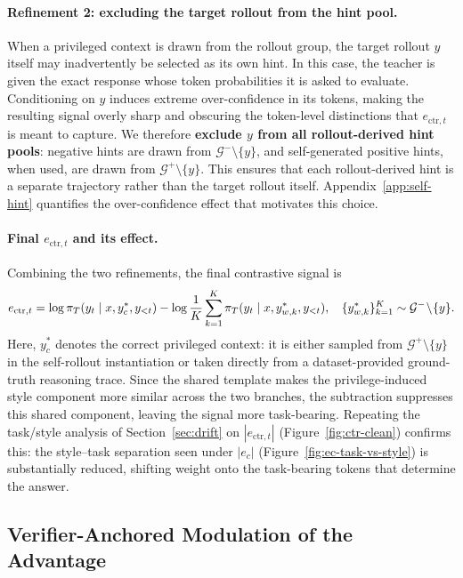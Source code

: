 \paragraph{Refinement 2: excluding the target rollout from the hint pool.}
When a privileged context is drawn from the rollout group, the target rollout $y$ itself may inadvertently be selected as its own hint. In this case, the teacher is given the exact response whose token probabilities it is asked to evaluate. Conditioning on $y$ induces extreme over-confidence in its tokens, making the resulting signal overly sharp and obscuring the token-level distinctions that $e_{\text{ctr},t}$ is meant to capture. We therefore \textbf{exclude $y$ from all rollout-derived hint pools}: negative hints are drawn from $\mathcal{G}^-\setminus\{y\}$, and self-generated positive hints, when used, are drawn from $\mathcal{G}^+\setminus\{y\}$. This ensures that each rollout-derived hint is a separate trajectory rather than the target rollout itself. Appendix~\ref{app:self-hint} quantifies the over-confidence effect that motivates this choice.

\paragraph{Final $e_{\mathrm{ctr},t}$ and its effect.}
Combining the two refinements, the final contrastive signal is
\begin{equation}
\small
e_{\mathrm{ctr},t}
= \log \pi_T(y_t \mid x, y_c^*, y_{<t})
- \log \frac{1}{K}\sum_{k=1}^{K}
\pi_T(y_t \mid x, y_{w,k}^*, y_{<t}),
\quad
\{y_{w,k}^*\}_{k=1}^{K}
\sim \mathcal{G}^-\!\setminus\!\{y\}.
\label{eq:final-ectr}
\end{equation}
Here, $y_c^*$ denotes the correct privileged context: it is either sampled
from $\mathcal{G}^+\setminus\{y\}$ in the self-rollout instantiation or
taken directly from a dataset-provided ground-truth reasoning trace.
Since the shared template makes the privilege-induced style component more similar across the two branches, the subtraction suppresses this shared component, leaving the signal more task-bearing. Repeating the task/style analysis of Section~\ref{sec:drift} on
$|e_{\mathrm{ctr},t}|$ (Figure~\ref{fig:ctr-clean}) confirms this: the
style--task separation seen under $|e_c|$ (Figure~\ref{fig:ec-task-vs-style})
is substantially reduced, shifting weight onto the task-bearing tokens that
determine the answer.


\subsection{Verifier-Anchored Modulation of the Advantage}
\label{sec:method-mod}

